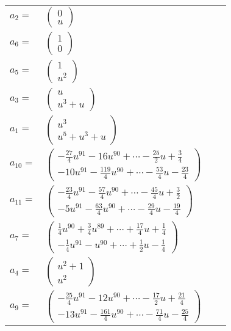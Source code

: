 \documentclass[1p]{elsarticle_modified}
\theoremstyle{definition}
\begin{document}
\begin{tabular}{m{7pt} m{180pt} m{7pt} m{180pt} }
\flushright $a_{2}=$&$\begin{pmatrix}0\\u\end{pmatrix}$ \\
\flushright $a_{6}=$&$\begin{pmatrix}1\\0\end{pmatrix}$ \\
\flushright $a_{5}=$&$\begin{pmatrix}1\\u^2\end{pmatrix}$ \\
\flushright $a_{3}=$&$\begin{pmatrix}u\\u^3+u\end{pmatrix}$ \\
\flushright $a_{1}=$&$\begin{pmatrix}u^3\\u^5+u^3+u\end{pmatrix}$ \\
\flushright $a_{10}=$&$\begin{pmatrix}-\frac{27}{4} u^{91}-16 u^{90}+\cdots-\frac{25}{2} u+\frac{3}{4}\\-10 u^{91}-\frac{119}{4} u^{90}+\cdots-\frac{53}{4} u-\frac{23}{4}\end{pmatrix}$ \\
\flushright $a_{11}=$&$\begin{pmatrix}-\frac{23}{4} u^{91}-\frac{57}{4} u^{90}+\cdots-\frac{45}{4} u+\frac{3}{2}\\-5 u^{91}-\frac{63}{4} u^{90}+\cdots-\frac{29}{4} u-\frac{19}{4}\end{pmatrix}$ \\
\flushright $a_{7}=$&$\begin{pmatrix}\frac{1}{4} u^{90}+\frac{3}{4} u^{89}+\cdots+\frac{17}{4} u+\frac{1}{4}\\-\frac{1}{4} u^{91}- u^{90}+\cdots+\frac{1}{2} u-\frac{1}{4}\end{pmatrix}$ \\
\flushright $a_{4}=$&$\begin{pmatrix}u^2+1\\u^2\end{pmatrix}$ \\
\flushright $a_{9}=$&$\begin{pmatrix}-\frac{25}{4} u^{91}-12 u^{90}+\cdots-\frac{17}{2} u+\frac{21}{4}\\-13 u^{91}-\frac{161}{4} u^{90}+\cdots-\frac{71}{4} u-\frac{25}{4}\end{pmatrix}$ \\

\end{tabular}
\end{document}
